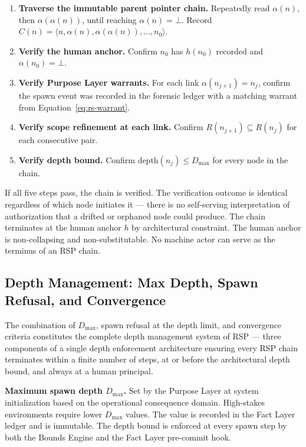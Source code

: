 \begin{enumerate}
    \item[(V1)] \textbf{Traverse the immutable parent pointer chain.} Repeatedly read $\alpha(n)$, then $\alpha(\alpha(n))$, until reaching $\alpha(n) = \bot$. Record $C(n) = \langle n, \alpha(n), \alpha(\alpha(n)), \ldots, n_0 \rangle$.
    \item[(V2)] \textbf{Verify the human anchor.} Confirm $n_0$ has $h(n_0)$ recorded and $\alpha(n_0) = \bot$.
    \item[(V3)] \textbf{Verify Purpose Layer warrants.} For each link $\alpha(n_{j+1}) = n_j$, confirm the spawn event was recorded in the forensic ledger with a matching warrant from Equation~\ref{eq:rs-warrant}.
    \item[(V4)] \textbf{Verify scope refinement at each link.} Confirm $R(n_{j+1}) \subseteq R(n_j)$ for each consecutive pair.
    \item[(V5)] \textbf{Verify depth bound.} Confirm $\text{depth}(n_j) \leq D_{\max}$ for every node in the chain.
\end{enumerate}

If all five steps pass, the chain is verified. The verification outcome is identical regardless of which node initiates it — there is no self-serving interpretation of authorization that a drifted or orphaned node could produce. The chain terminates at the human anchor $h$ by architectural constraint. The human anchor is non-collapsing and non-substitutable. No machine actor can serve as the terminus of an RSP chain.

\subsection{Depth Management: Max Depth, Spawn Refusal, and Convergence}
\label{sec:rs-depth-mgmt}

The combination of $D_{\max}$, spawn refusal at the depth limit, and convergence criteria constitutes the complete depth management system of RSP — three components of a single depth enforcement architecture ensuring every RSP chain terminates within a finite number of steps, at or before the architectural depth bound, and always at a human principal.

\medskip
\noindent\textbf{Maximum spawn depth $D_{\max}$.} Set by the Purpose Layer at system initialization based on the operational consequence domain. High-stakes environments require lower $D_{\max}$ values. The value is recorded in the Fact Layer ledger and is immutable. The depth bound is enforced at every spawn step by both the Bounds Engine and the Fact Layer pre-commit hook.

